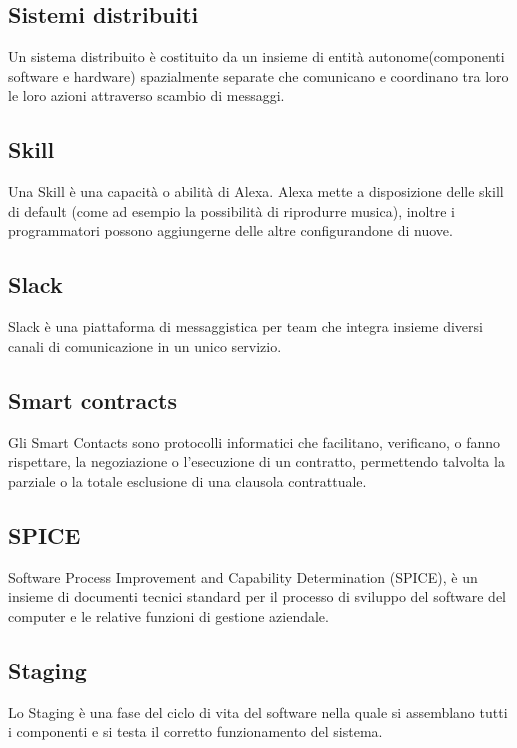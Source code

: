\subsection{Sistemi distribuiti}
Un sistema distribuito è costituito da un insieme di entità autonome(componenti software e hardware) spazialmente separate che comunicano e coordinano tra loro le loro azioni attraverso scambio di messaggi.

\subsection{Skill}
Una Skill è una capacità o abilità di Alexa. Alexa mette a disposizione delle skill di default (come ad esempio la possibilità di riprodurre musica), inoltre i programmatori possono aggiungerne delle altre configurandone di nuove.

\subsection{Slack}
Slack è una piattaforma di messaggistica per team che integra insieme diversi canali di comunicazione in un unico servizio.


\subsection{Smart contracts}
Gli Smart Contacts sono protocolli informatici che facilitano, verificano, o fanno rispettare, la negoziazione o l'esecuzione di un contratto, permettendo talvolta la parziale o la totale esclusione di una clausola contrattuale.

\subsection{SPICE}
Software Process Improvement and Capability Determination (SPICE), è un insieme di documenti tecnici standard per il processo di sviluppo del software del computer e le relative funzioni di gestione aziendale.


\subsection{Staging}
Lo Staging è una fase del ciclo di vita del software nella quale si assemblano tutti i componenti e si testa il corretto funzionamento del sistema.

